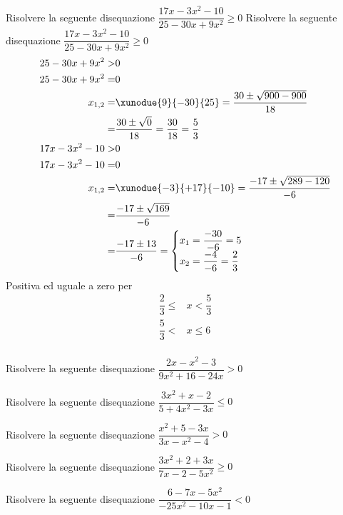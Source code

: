 \begin{exercise}
		Risolvere la seguente disequazione $\dfrac{17x-3x^2-10}{25-30x+9x^2}\geq 0$
	\tcblower
	Risolvere la seguente disequazione $\dfrac{17x-3x^2-10}{25-30x+9x^2}\geq 0$
	\begin{align*}
25-30x+9x^2>&0\\
25-30x+9x^2=&0\\
x_{1,2}=&\xunodue{9}{-30}{25}=\dfrac{30\pm\sqrt{900-900}}{18}\\
=&\dfrac{30\pm\sqrt{0}}{18}=\dfrac{30}{18}=\dfrac{5}{3}\\
17x-3x^2-10>&0\\
17x-3x^2-10=&0\\
x_{1,2}=&\xunodue{-3}{+17}{-10}=\dfrac{-17\pm\sqrt{289-120}}{-6}\\
=&\dfrac{-17\pm\sqrt{169}}{-6}\\
=&\dfrac{-17\pm 13}{-6}=\begin{cases}
x_1=\dfrac{-30}{-6}=5\\
x_2=\dfrac{-4}{-6}=\dfrac{2}{3}
\end{cases}\\
	\end{align*}
Positiva ed uguale a zero per
	\begin{align*}
	\dfrac{2}{3}\leq&x<\dfrac{5}{3}\\
	\dfrac{5}{3}<&x\leq 6\\
	\end{align*}
\begin{center}
	
\end{center}
\end{exercise}
\begin{exercise}[no solution]
		Risolvere la seguente disequazione $\dfrac{2x-x^2-3}{9x^2+16-24x}> 0$
\end{exercise}
\begin{exercise}[no solution]
		Risolvere la seguente disequazione $\dfrac{3x^2+x-2}{5+4x^2-3x}\leq 0$
\end{exercise}
\begin{exercise}[no solution]
		Risolvere la seguente disequazione $\dfrac{x^2+5-3x}{3x-x^2-4}> 0$
\end{exercise}
\begin{exercise}[no solution]
		Risolvere la seguente disequazione $\dfrac{3x^2+2+3x}{7x-2-5x^2}\geq0$
\end{exercise}
\begin{exercise}[no solution]
		Risolvere la seguente disequazione $\dfrac{6-7x-5x^2}{-25x^2-10x-1}< 0$
\end{exercise}